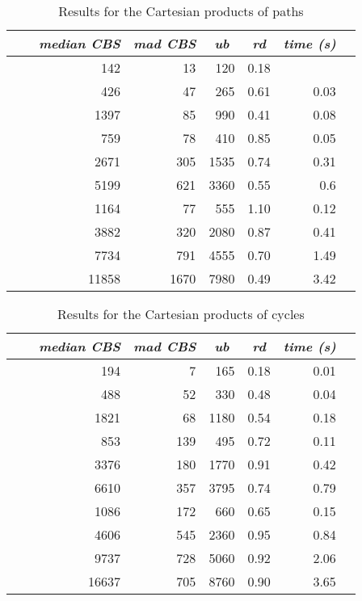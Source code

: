 \documentclass{scrartcl}
\theoremstyle{plain}
\newcommand{\cbs}{CBS}
\begin{document}
\begin{table}[!ht]
	\centering
	\scriptsize
	\begin{tabular}{|ll|rr|r|r|r|r|} 
	\hline
	\multicolumn{1}{|c}{} &
	\multicolumn{1}{c|}{} &
	\multicolumn{1}{c}{\emph{median \cbs{}}} &
	\multicolumn{1}{c|}{\emph{mad \cbs{}}} &
	\multicolumn{1}{c|}{\emph{ub}} &
	\multicolumn{1}{c|}{\emph{rd}} &
	\multicolumn{1}{c|}{\emph{time (s)}} \\ \hline
		
	\makeatletter{} &  & 142 & 13 & 120 & 0.18 &  \\ 
 &  & 426 & 47 & 265 & 0.61 & 0.03 \\ 
 &  & 1397 & 85 & 990 & 0.41 & 0.08 \\ 
 &  & 759 & 78 & 410 & 0.85 & 0.05 \\ 
 &  & 2671 & 305 & 1535 & 0.74 & 0.31 \\ 
 &  & 5199 & 621 & 3360 & 0.55 & 0.6 \\ 
 &  & 1164 & 77 & 555 & 1.10 & 0.12 \\ 
 &  & 3882 & 320 & 2080 & 0.87 & 0.41 \\ 
 &  & 7734 & 791 & 4555 & 0.70 & 1.49 \\ 
 &  & 11858 & 1670 & 7980 & 0.49 & 3.42 \\ 
 
	
	\hline
	\end{tabular}
	\caption{\label{tab:cart_pp_perf}Results for the Cartesian products of 
paths}

\end{table}


\begin{table}[!ht]
	\centering
	\scriptsize
	\begin{tabular}{|ll|rr|r|r|r|r|} 
	\hline
	\multicolumn{1}{|c}{} &
	\multicolumn{1}{c|}{} &
	\multicolumn{1}{c}{\emph{median \cbs{}}} &
	\multicolumn{1}{c|}{\emph{mad \cbs{}}} &
	\multicolumn{1}{c|}{\emph{ub}} &
	\multicolumn{1}{c|}{\emph{rd}} &
	\multicolumn{1}{c|}{\emph{time (s)}} \\ \hline
		
	\makeatletter{} &  & 194 & 7 & 165 & 0.18 & 0.01 \\ 
 &  & 488 & 52 & 330 & 0.48 & 0.04 \\ 
 &  & 1821 & 68 & 1180 & 0.54 & 0.18 \\ 
 &  & 853 & 139 & 495 & 0.72 & 0.11 \\ 
 &  & 3376 & 180 & 1770 & 0.91 & 0.42 \\ 
 &  & 6610 & 357 & 3795 & 0.74 & 0.79 \\ 
 &  & 1086 & 172 & 660 & 0.65 & 0.15 \\ 
 &  & 4606 & 545 & 2360 & 0.95 & 0.84 \\ 
 &  & 9737 & 728 & 5060 & 0.92 & 2.06 \\ 
 &  & 16637 & 705 & 8760 & 0.90 & 3.65 \\ 
 
	
	\hline
	\end{tabular}
	\caption{\label{tab:cart_cc_perf}Results for the Cartesian products of 
cycles}

\end{table}
\end{document}
